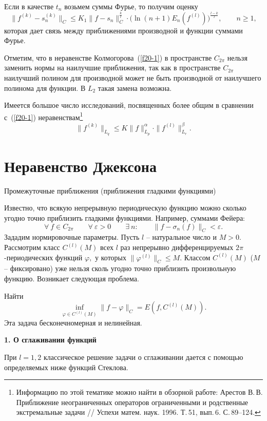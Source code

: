  Если в качестве $t_n$ возьмем суммы Фурье, то получим оценку
 $$
   \|f^{(k)}-s_n^{(k)}\|_C\le K_{{1}} \|f-s_n \|_C^{\frac{k}{l}}\cdot
   \Big(\ln (n+1)  {E_n(f^{(l)})\Big)^{\frac{l-k}{l}},\qquad n\ge 1},
 $$
 которая дает связь между приближениями производной и функции
 суммами Фурье.

 Отметим, что в неравенстве Колмогорова~(\ref{f20-1}) в пространстве $C_{2\pi}$
 нельзя заменить нормы на наилучшие приближения, так как в
 пространстве $C_{2\pi}$ наилучший полином для производной может не быть
 производной от наилучшего полинома для функции. В $L_2$ такая замена возможна.

Имеется большое число исследований, посвященных более общим
 в сравнении с~(\ref{f20-1}) неравенствам\footnote{Информацию по
 этой тематике можно найти в обзорной работе:
Арестов В.\,В. Приближение неограниченных операторов ограниченными и
родственные экстремальные задачи
 // Успехи матем. наук. 1996. Т.\,51, вып.\,6. С.\,89--124.}
 $$
 \|f^{(k)}\|_{L_q}\le K\|f\|_{L_p}^{\alpha}\cdot
 \|f^{(l)}\|_{L_r}^{\beta}.
 $$


 \section{Неравенство Джексона}

 {Промежуточные приближения (приближения гладкими
 функциями)}
 \vspace{3mm}

 Известно, что всякую непрерывную периодическую  функцию можно сколько угодно
 точно приблизить гладкими функциями. Например, суммами
 Фейера:
 $$
 \forall\ f\in C_{{2\pi}}\qquad \forall\ \varepsilon>0\qquad \exists\ n:\qquad
 \|f-\sigma_n{(f)}\|_C<\varepsilon.
 $$
 Зададим нормировочные параметры. Пусть $l$
 -- натуральное число и $M>0.$ Рассмотрим класс $C^{(l)}(M)$ всех
 $l$ раз непрерывно дифференцируемых $2\pi$-периодических
 функций $\varphi,$ у которых  $\|\varphi^{(l)}\|_C\le M.$
 Классом $C^{(l)}(M)$ ($M$ -- фиксировано) уже нельзя  сколь угодно точно
 приблизить произвольную
 функцию. Возникает следующая проблема.

 \task %
 Найти
 $$
 \inf_{\varphi\in C^{(l)}(M)} \|f-\varphi\|_C=E(f,C^{(l)}(M)).
 $$
 Эта задача бесконечномерная и нелинейная.

\vspace{3mm}
 {\bf 1. О сглаживании функций}
 \vspace{3mm}

 При $l=1,2$ классическое решение задачи о сглаживании дается
 с помощью определяемых ниже функций Стеклова.

